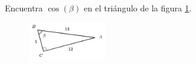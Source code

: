 Encuentra $\cos(\beta)$ en el triángulo de la figura \ref{fig:functrig09}.
\begin{figure}[H]
    \begin{center}
        \includegraphics[width=0.3\textwidth]{../images/functrig09.png}
    \end{center}
    \caption{}
    \label{fig:functrig09}
\end{figure}
